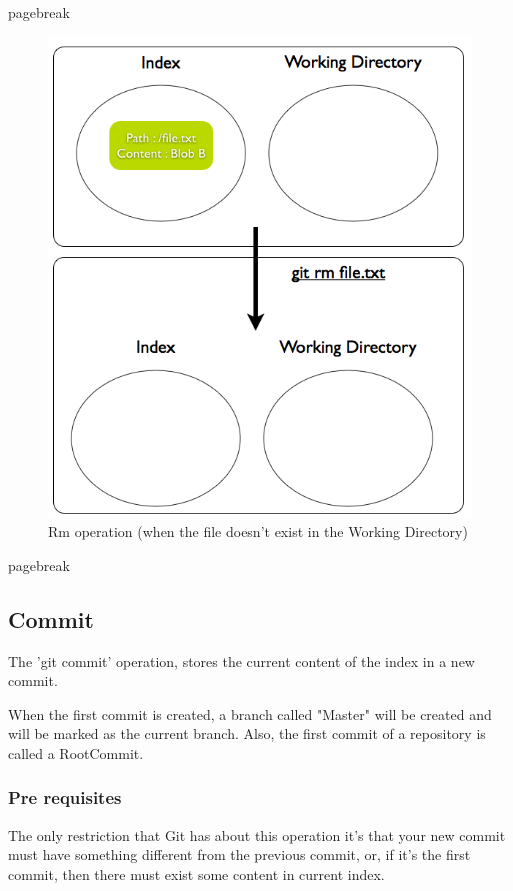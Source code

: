pagebreak
\pagebreak 

\begin{figure}[h] 
	\caption{Rm operation (when the file doesn't exist in the Working
	Directory)}
	\centering
	\includegraphics[scale=0.40]{images/rm2.png}
\end{figure}

pagebreak
\pagebreak 


\subsection{Commit}
The 'git commit' operation, stores the current content of the index in a new
commit. \par
When the first commit is created, a branch called "Master" will be created
and will be marked as the current branch. Also, the first commit of a repository
is called a RootCommit. \par

\subsubsection{Pre requisites}

The only restriction that Git has about this operation 
it's that your new commit must have something different from the previous
commit, or, if it's the first commit, then there must exist some content in
current index. \par


